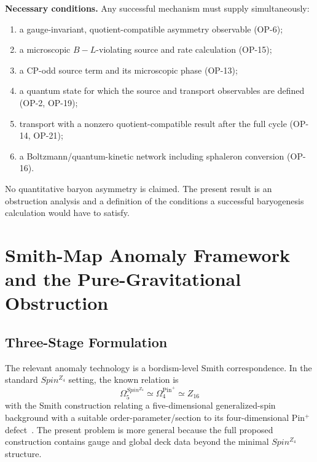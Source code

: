 \documentclass[11pt]{article}
\theoremstyle{canonmath}
\theoremstyle{canonpostulate}
\theoremstyle{canonclaim}
\providecommand{\Pin}{\operatorname{Pin}}
\def\mathrm#1{#1}%
\def\mathbb#1{#1}%
\begin{document}
\textbf{Necessary conditions.} Any successful mechanism must supply simultaneously:
\begin{enumerate}
\item a gauge-invariant, quotient-compatible asymmetry observable (OP-6);
\item a microscopic $B-L$-violating source and rate calculation (OP-15);
\item a CP-odd source term and its microscopic phase (OP-13);
\item a quantum state for which the source and transport observables are defined (OP-2, OP-19);
\item transport with a nonzero quotient-compatible result after the full cycle (OP-14, OP-21);
\item a Boltzmann/quantum-kinetic network including sphaleron conversion (OP-16).
\end{enumerate}

\begin{keyresult}
No quantitative baryon asymmetry is claimed. The present result is an obstruction analysis and a definition of the conditions a successful baryogenesis calculation would have to satisfy.
\end{keyresult}

\section{Smith-Map Anomaly Framework and the Pure-Gravitational Obstruction}
\label{sec:anomaly}

\subsection{Three-Stage Formulation}

The relevant anomaly technology is a bordism-level Smith correspondence. In the standard $\mathrm{Spin}^{\mathbb Z_4}$ setting, the known relation is
\begin{equation}
\Omega_5^{\mathrm{Spin}^{\mathbb Z_4}}
\simeq
\Omega_4^{\Pin^+}
\simeq
\mathbb Z_{16}
\end{equation}
with the Smith construction relating a five-dimensional generalized-spin background with a suitable order-parameter/section to its four-dimensional Pin$^+$ defect~\cite{HasonKomargodskiThorngren,GarciaEtxebarria}. The present problem is more general because the full proposed construction contains gauge and global deck data beyond the minimal $\mathrm{Spin}^{\mathbb Z_4}$ structure.
\end{document}
